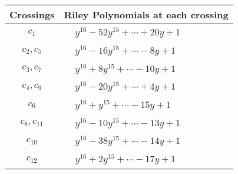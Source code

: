 \documentclass[1p]{elsarticle_modified}
\theoremstyle{definition}
\begin{document}
\begin{tabular}{m{50pt}|m{274pt}}
Crossings & \hspace{64pt}Riley Polynomials at each crossing \\
\hline $$\begin{aligned}c_{1}\end{aligned}$$&$\begin{aligned}
&y^{16}-52 y^{15}+\cdots+20 y+1
\end{aligned}$\\
\hline $$\begin{aligned}c_{2},c_{5}\end{aligned}$$&$\begin{aligned}
&y^{16}-16 y^{15}+\cdots-8 y+1
\end{aligned}$\\
\hline $$\begin{aligned}c_{3},c_{7}\end{aligned}$$&$\begin{aligned}
&y^{16}+8 y^{15}+\cdots-10 y+1
\end{aligned}$\\
\hline $$\begin{aligned}c_{4},c_{9}\end{aligned}$$&$\begin{aligned}
&y^{16}-20 y^{15}+\cdots+4 y+1
\end{aligned}$\\
\hline $$\begin{aligned}c_{6}\end{aligned}$$&$\begin{aligned}
&y^{16}+y^{15}+\cdots-15 y+1
\end{aligned}$\\
\hline $$\begin{aligned}c_{8},c_{11}\end{aligned}$$&$\begin{aligned}
&y^{16}-10 y^{15}+\cdots-13 y+1
\end{aligned}$\\
\hline $$\begin{aligned}c_{10}\end{aligned}$$&$\begin{aligned}
&y^{16}-38 y^{15}+\cdots-14 y+1
\end{aligned}$\\
\hline $$\begin{aligned}c_{12}\end{aligned}$$&$\begin{aligned}
&y^{16}+2 y^{15}+\cdots-17 y+1
\end{aligned}$\\
\hline
\end{tabular}\\~\\
\end{document}

